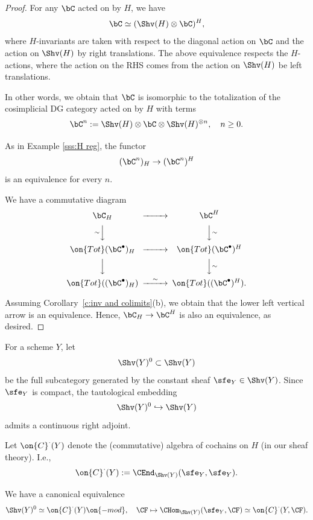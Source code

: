 \documentclass[9pt]{amsart}
\theoremstyle{definition}
\theoremstyle{remark}
\newcommand{\corref}[1]{Corollary~\ref{#1}}
\numberwithin{equation}{section}
\renewcommand{\mod}{{\on{-mod}}}
\begin{document}
\begin{proof}

For any $\bC$ acted on by $H$, we have
$$\bC\simeq (\Shv(H)\otimes \bC)^H,$$
where $H$-invariants are taken with respect to the diagonal action on $\bC$ and the action on $\Shv(H)$
by right translations. The above equivalence respects the $H$-actions, where the action on the RHS comes from
the action on $\Shv(H)$ be left translations.

\medskip

In other words, we obtain that $\bC$ is isomorphic to the totalization of the cosimplicial DG category acted on by $H$ 
with terms 
$$\bC^n:=\Shv(H) \otimes \bC \otimes \Shv(H)^{\otimes n}, \quad n\geq 0.$$

As in Example \ref{sss:H reg}, the functor
$$(\bC^n)_H\to (\bC^n)^H$$
is an equivalence for every $n$. 

\medskip

We have a commutative diagram
$$
\CD
\bC_H  @>>>  \bC^H  \\
@V{\sim}VV  @VV{\sim}V  \\
\on{Tot}(\bC^\bullet)_H   @>>>  \on{Tot}(\bC^\bullet)^H \\
@VVV   @VV{\sim}V  \\
\on{Tot}((\bC^\bullet)_H)  @>{\sim}>> \on{Tot}((\bC^\bullet)^H). 
\endCD
$$

Assuming \corref{c:inv and colimits}(b), we obtain that the lower left vertical arrow is an equivalence.
Hence, $\bC_H\to \bC^H$ is also an equivalence, as desired. 

\end{proof}



\sssec{}  \label{sss:loc const}

For a scheme $Y$, let 
$$\Shv(Y)^0\subset \Shv(Y)$$
be the full subcategory generated by the constant sheaf $\sfe_Y\in \Shv(Y)$. Since  $\sfe_Y$ is compact, the tautological
embedding 
$$\Shv(Y)^0\hookrightarrow \Shv(Y)$$
admits a continuous right adjoint. 

\medskip

Let $\on{C}^\cdot(Y)$ denote the (commutative) algebra of cochains on $H$ (in our sheaf theory). I.e.,
$$\on{C}^\cdot(Y):=\CEnd_{\Shv(Y)}(\sfe_Y,\sfe_Y).$$

We have a canonical equivalence
$$\Shv(Y)^0\simeq \on{C}^\cdot(Y)\mod, \quad \CF\mapsto \CHom_{\Shv(Y)}(\sfe_Y,\CF)\simeq \on{C}^\cdot(Y,\CF).$$

\sssec{}
\end{document}
